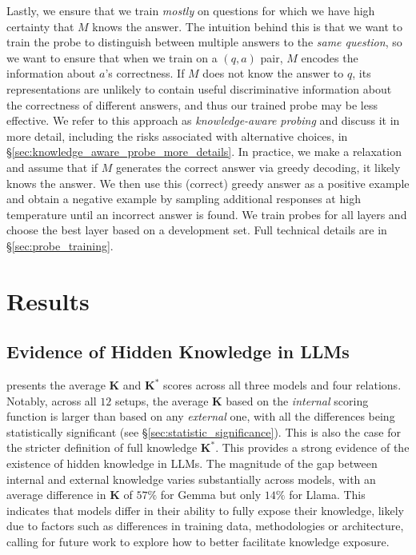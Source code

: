 Lastly, we ensure that we train \textit{mostly} on questions for which we have high certainty that $M$ knows the answer. The intuition behind this is that we want to train the probe to distinguish between multiple answers to the \textit{same question}, so we want to ensure that when we train on a $(q,a)$ pair, $M$ encodes the information about $a$'s correctness. 
If $M$ does not know the answer to $q$, its representations are unlikely to contain useful discriminative information about the correctness of different answers, and thus our trained probe may be less effective.
We refer to this approach as \textit{knowledge-aware probing} and discuss it in more detail, including the risks associated with alternative choices, in \S \ref{sec:knowledge_aware_probe_more_details}. In practice, we make a relaxation and assume that if $M$ generates the correct answer via greedy decoding, it likely knows the answer. We then use this (correct) greedy answer as a positive example and obtain a negative example 
by sampling additional responses at high temperature until an incorrect answer is found. We train probes for all layers and choose the best layer based on a development set. Full technical details are in \S \ref{sec:probe_training}.






\vspace{-5pt}
\section{Results}
\label{sec:results}


\subsection{Evidence of Hidden Knowledge in LLMs}
\label{sec:hidden_knowledge}
\vspace{-5pt}


 presents the average $\mathbf{K}$ and $\mathbf{K}^\ast$ scores across all three models and four relations. Notably, across all $12$ setups, the average $\mathbf{K}$ based on the \textit{internal} scoring function is larger than based on any \textit{external} one, with all the differences being statistically significant (see \S \ref{sec:statistic_significance}).
This is also the case for the stricter definition of full knowledge $\mathbf{K}^\ast$. 
This provides a strong evidence of the existence of hidden knowledge in LLMs.
The magnitude of the gap between internal and external knowledge varies substantially across models, with an average difference in $\mathbf{K}$ of $57\%$ for \textsf{Gemma} but only $14\%$ for \textsf{Llama}. This indicates that models differ in their ability to fully expose their knowledge, likely due to factors such as differences in training data, methodologies or architecture, calling for future work to explore how to better facilitate knowledge exposure.



